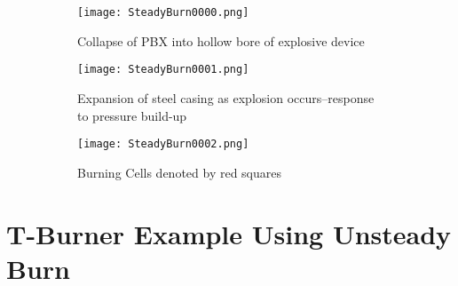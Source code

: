





\begin{figure}
  \centering
  \begin{subfigure}[b]{0.3\textwidth}
    \texttt{[image: SteadyBurn0000.png]}
    \caption{Collapse of PBX into hollow bore of explosive device}
    \label{figsteadyburn1}
  \end{subfigure}
  \begin{subfigure}[b]{0.3\textwidth}
    \texttt{[image: SteadyBurn0001.png]}
    \caption{Expansion of steel casing as explosion occurs--response to pressure build-up}
    \label{figsteadyburn2}
  \end{subfigure}
  \begin{subfigure}[b]{0.3\textwidth}
    \texttt{[image: SteadyBurn0002.png]}
    \caption{Burning Cells denoted by red squares}
    \label{figsteadyburn3}
  \end{subfigure}
  \caption{}
  \label{fig:mpmice2}
\end{figure}


\newpage
%
\newpage
\section*{\center  T-Burner Example Using Unsteady Burn}
